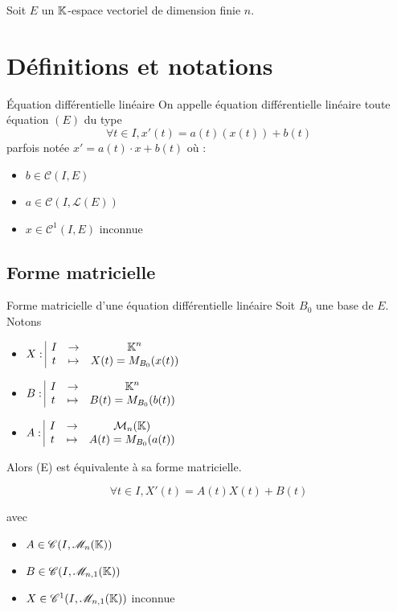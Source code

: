 Soit $E$ un $\mathbb{K}$-espace vectoriel de dimension finie $n$.

\section{Définitions et notations}


\lvspace \begin{definition}{Équation différentielle linéaire}{}
    On appelle équation différentielle linéaire toute équation $(E)$ du type 
    $$\forall t \in I, x'(t) = a(t)(x(t)) + b(t)$$ parfois notée 
    $x' = a(t) \cdot x + b(t)$ où : 
    \begin{itemize}
        \item $b \in \mathscr C(I, E)$
        \item $a \in \mathscr C(I, \mathscr L(E))$
        \item $x \in \mathscr C^1(I, E)$ inconnue
    \end{itemize}
\end{definition}

\subsection{Forme matricielle}

\begin{proposition}{Forme matricielle d'une équation différentielle linéaire}{}
    Soit $B_0$ une base de $E$. Notons 
    
    \begin{itemize}
        \item $X: \space \begin{array}{|ccc} \displaystyle I & \to & \displaystyle \mathbb{K}^n \\ \displaystyle t & \mapsto & \displaystyle X(t) = M_{B_0}(x(t)) \end{array}$
        \item \avspace $B: \space \begin{array}{|ccc} \displaystyle I & \to & \displaystyle \mathbb{K}^n \\ \displaystyle t & \mapsto & \displaystyle B(t) = M_{B_0}(b(t)) \end{array}$ 
        \item \avspace $A: \space \begin{array}{|ccc} \displaystyle I & \to & \displaystyle \mathcal M_n(\mathbb{K}) \\ \displaystyle t & \mapsto & \displaystyle A(t) = M_{B_0}(a(t)) \end{array}$
    \end{itemize}

    Alors (E) est équivalente à sa forme matricielle. 

    $$\forall t \in I, X'(t) = A(t)X(t) + B(t)$$

    avec 
    \begin{itemize}
        \item $A \in \mathscr C(I, \mathscr M_n(\mathbb{K}))$
        \item $B \in \mathscr C(I, \mathscr M_{n,1}(\mathbb{K}))$
        \item $X \in \mathscr C^1(I, \mathscr M_{n,1}(\mathbb{K}))$ inconnue
    \end{itemize}
\end{proposition}

